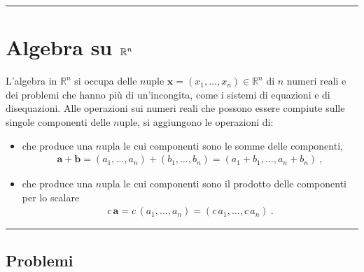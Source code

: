 \documentclass[letterpaper,10pt,italian]{jupyterBook}
\begin{document}
\bigskip\hrule\bigskip






\sphinxstepscope




\chapter{Algebra su \protect\(\mathbb{R}^n\protect\)}
\label{\detokenize{ch/algebra/real-n-algebra:algebra-su-mathbb-r-n}}\label{\detokenize{ch/algebra/real-n-algebra:math-hs-algebra-real-n}}\label{\detokenize{ch/algebra/real-n-algebra::doc}}
\sphinxAtStartPar
L’algebra in \( \mathbb{R}^n \) si occupa delle \(n\)\sphinxhyphen{}uple \(\mathbf{x} = (x_1, \dots, x_n) \in \mathbb{R}^n\) di \(n\) numeri reali e dei problemi che hanno più di un’incongita, come i sistemi di equazioni e di disequazioni. Alle operazioni sui numeri reali che possono essere compiute sulle singole componenti delle \(n\)\sphinxhyphen{}uple, si aggiungono le operazioni di:
\begin{itemize}
\item {} 
\sphinxAtStartPar
{} che produce una \(n\)\sphinxhyphen{}upla le cui componenti sono le somme delle componenti,
\begin{equation*}
\begin{split}\mathbf{a} + \mathbf{b} = (a_1,\dots,a_n) + (b_1,\dots,b_n) = (a_1+b_1,\dots,a_n+b_n) \ ,\end{split}
\end{equation*}
\item {} 
\sphinxAtStartPar
{} che produce una \(n\)\sphinxhyphen{}upla le cui componenti sono il prodotto delle componenti per lo scalare
\begin{equation*}
\begin{split}c \, \mathbf{a} = c \, (a_1,\dots,a_n) = (c \, a_1, \dots, c \, a_n) \ .\end{split}
\end{equation*}
\end{itemize}


\bigskip\hrule\bigskip



\section{Problemi}
\label{\detokenize{ch/algebra/real-n-algebra:problemi}}
\end{document}
